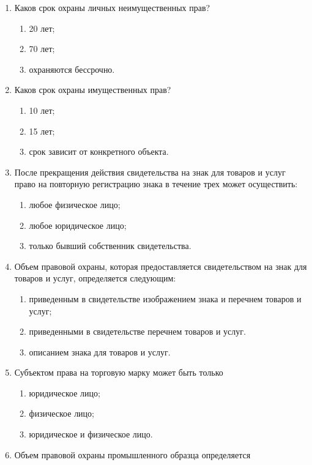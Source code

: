 \begin{enumerate}
    \item Каков срок охраны личных неимущественных прав?
    \begin{enumerate}
        \item 20 лет;
        \item 70 лет; 
        \item \cmark охраняются бессрочно.
    \end{enumerate}
    \item Каков срок охраны имущественных прав?
    \begin{enumerate}
        \item 10 лет;
        \item 15 лет;
        \item \cmark срок зависит от конкретного объекта.
    \end{enumerate}
    \item После прекращения действия свидетельства на знак для товаров и услуг право на повторную регистрацию знака в течение трех может осуществить:
    \begin{enumerate}
        \item любое физическое лицо;
        \item любое юридическое  лицо;
        \item \cmark только бывший собственник свидетельства.
    \end{enumerate}
    \item Объем правовой охраны, которая предоставляется свидетельством на знак для товаров и услуг, определяется следующим:
    \begin{enumerate}
        \item \cmark приведенным в свидетельстве изображением знака и перечнем товаров и услуг;
        \item приведенными в свидетельстве перечнем товаров и услуг.
        \item описанием знака для товаров и услуг. 
    \end{enumerate}
    \item Субъектом права на торговую марку может быть только 
    \begin{enumerate}
        \item юридическое лицо;
        \item физическое лицо;
        \item \cmark юридическое и физическое лицо.
    \end{enumerate}
    \item Объем правовой охраны промышленного образца  определяется 

\end{enumerate}
